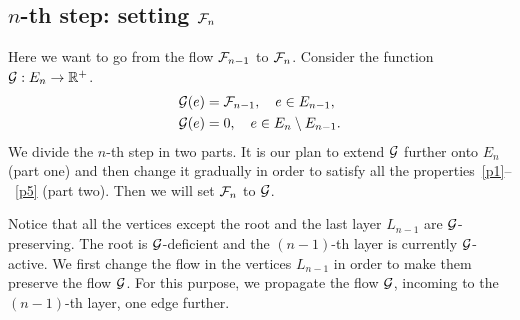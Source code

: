 \documentclass[12pt,oneside,a4paper]{amsart}
\begin{document}
      \medskip
      \subsection{\texorpdfstring{$n$}{n}-th step: setting \texorpdfstring{$\flowposn{n}$}{Fn}}
        Here we want to go from the flow $\flowposn{n-1}$ to $\flowposn{n}$.
        Consider the function $\cal{G}: E_n \to \mathbb{R}^{+}$.
        \begin{align*}
          &\cal{G}(e) = \flowposn{n-1}, \quad e \in E_{n-1},\\
          &\cal{G}(e) = 0, \quad e \in E_n \setminus E_{n-1}.
        \end{align*}
        We divide the $n$-th step in two parts.
        It is our plan to extend $\cal{G}$ further onto $E_n$ (part one) and then change it gradually in order
          to satisfy all the properties~\ref{p1}--~\ref{p5} (part two).
        Then we will set $\flowposn{n}$ to $\cal{G}$.

        Notice that all the vertices except the root and the last layer $L_{n-1}$ are $\cal{G}$-preserving.
        The root is $\cal{G}$-deficient and the $(n-1)$-th layer is currently $\cal{G}$-active.
        We first change the flow in the vertices $L_{n-1}$ in order to make them preserve the flow $\cal{G}$.
        For this purpose, we propagate the flow $\cal{G}$, incoming to the $(n-1)$-th layer, one edge further.
\end{document}
